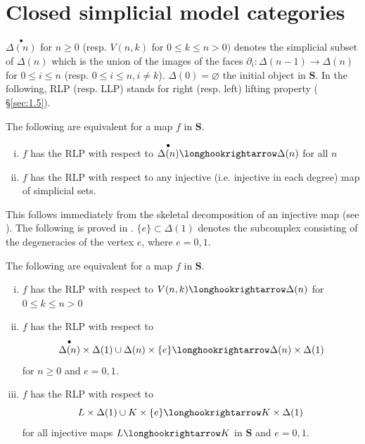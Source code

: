 \documentclass[../main]{subfiles}
\begin{document}
\section{Closed simplicial model categories}\label{sec:2.2}

$\overset{\bullet}{\Delta(n)}$ for $n \geq 0$ (resp. $V(n,k)$ for $0 \leq k \leq n > 0)$ denotes the simplicial subset of $\Delta(n)$ which is the union of the images of the faces $\partial_i \colon \Delta(n-1) \longrightarrow  \Delta(n)$ for $0 \leq i \leq n$ (resp. $0 \leq i \leq n, i \neq k$). $\dot{\Delta(0)} = \varnothing$ the initial object in $\mathbf{S}$. In the following, RLP (resp. LLP) stands for right (resp. left) lifting property ( \S\ref{sec:1.5}).

\begin{proposition} \label{prop:2.2.1} 
    The following are equivalent for a map $f$ in $\mathbf{S}$.
    \begin{enumerate}[(i)]
        \item $f$ has the RLP with respect to $\overset{\bullet}{\Delta(n)} \longhookrightarrow \Delta(n)$ for all $n$
        \item $f$ has the RLP with respect to any injective (i.e. injective in each degree) map of simplicial sets.
    \end{enumerate}
    \end{proposition}
    This follows immediately from the skeletal decomposition of an injective map (see \cite[Ch. II, 3.8]{gabriel_calculus_1967}). The following is proved in \cite[Ch. IV, \S 2.1]{gabriel_calculus_1967}. $\{e\} \subset \Delta(1)$ denotes the subcomplex consisting of the degeneracies of the vertex $e$, where $e=0,1$.


\begin{proposition}\label{prop:2.2.2}
    The following are equivalent for a map $f$ in $\mathbf{S}$.
    \begin{enumerate}[(i)]
        \item $f$ has the RLP with respect to $V(n,k) \longhookrightarrow \Delta(n)$ for $0 \leq k \leq n > 0$
        \item $f$ has the RLP with respect to \[\overset{\bullet}{\Delta(n)} \times \Delta(1) \cup \Delta(n) \times \{e\} \longhookrightarrow \Delta(n) \times \Delta(1)\] for $n \geq 0$ and $e=0,1$.
        \item $f$ has the RLP with respect to \[L\times \Delta(1) \cup K\times\{e\} \longhookrightarrow K \times \Delta(1)\] for all injective maps $L \longhookrightarrow K$ in $\mathbf{S}$ and $e=0,1$.
    \end{enumerate}
\end{proposition}
\end{document}

